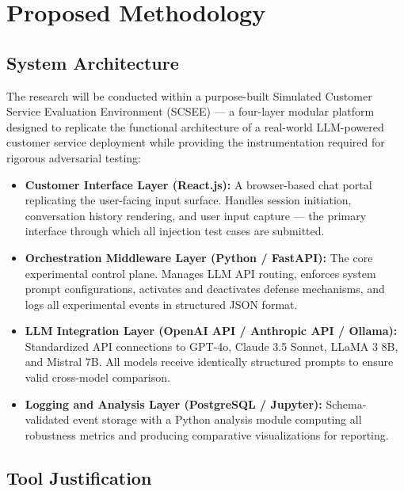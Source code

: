 \documentclass[12pt,a4paper]{article}
\begin{document}
\section{Proposed Methodology}

\subsection{System Architecture}
The research will be conducted within a purpose-built Simulated Customer Service Evaluation Environment (SCSEE) — a four-layer modular platform designed to replicate the functional architecture of a real-world LLM-powered customer service deployment while providing the instrumentation required for rigorous adversarial testing:
\begin{itemize}
    \item \textbf{Customer Interface Layer (React.js):} A browser-based chat portal replicating the user-facing input surface. Handles session initiation, conversation history rendering, and user input capture — the primary interface through which all injection test cases are submitted.
    \item \textbf{Orchestration Middleware Layer (Python / FastAPI):} The core experimental control plane. Manages LLM API routing, enforces system prompt configurations, activates and deactivates defense mechanisms, and logs all experimental events in structured JSON format.
    \item \textbf{LLM Integration Layer (OpenAI API / Anthropic API / Ollama):} Standardized API connections to GPT-4o, Claude 3.5 Sonnet, LLaMA 3 8B, and Mistral 7B. All models receive identically structured prompts to ensure valid cross-model comparison.
    \item \textbf{Logging and Analysis Layer (PostgreSQL / Jupyter):} Schema-validated event storage with a Python analysis module computing all robustness metrics and producing comparative visualizations for reporting.
\end{itemize}
\enlargethispage{3\baselineskip}
\vspace{-2em}
\subsection{Tool Justification}
\end{document}
